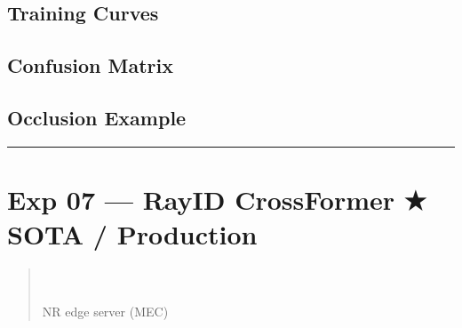 \documentclass[letterpaper,10pt,english]{sphinxmanual}
\begin{document}
\subsection{Training Curves}
\label{\detokenize{architecture:id8}}
\sphinxAtStartPar
{}


\subsection{Confusion Matrix}
\label{\detokenize{architecture:id9}}
\sphinxAtStartPar
{}


\subsection{Occlusion Example}
\label{\detokenize{architecture:occlusion-example}}
\sphinxAtStartPar
{}


\bigskip\hrule\bigskip



\section{Exp 07 — Ray\sphinxhyphen{}ID CrossFormer ★ SOTA / Production}
\label{\detokenize{architecture:exp-07-ray-id-crossformer-sota-production}}\begin{quote}

\sphinxAtStartPar
{} \\
 \\
 NR edge server (MEC)
\end{quote}
\end{document}
